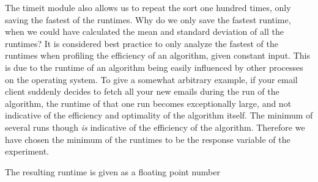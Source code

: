 The timeit module also allows us to repeat the sort one hundred times, only saving the fastest of the runtimes. Why do we only save the fastest runtime, when we could have calculated the mean and standard deviation of all the runtimes? It is considered best practice to only analyze the fastest of the runtimes when profiling the efficiency of an algorithm, given constant input. This is due to the runtime of an algorithm being easily influenced by other processes on the operating system. To give a somewhat arbitrary example, if your email client suddenly decides to fetch all your new emails during the run of the algorithm, the runtime of that one run becomes exceptionally large, and not indicative of the efficiency and optimality of the algorithm itself. The minimum of several runs though \textit{is} indicative of the efficiency of the algorithm. Therefore we have chosen the minimum of the runtimes to be the response variable of the experiment.

The resulting runtime is given as a floating point number